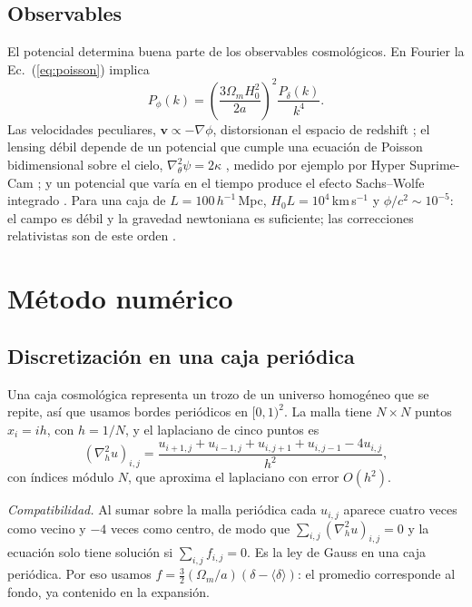 \documentclass{aa}
\newcommand{\vv}{\mathbf{v}}
\begin{document}
\subsection{Observables}

El potencial determina buena parte de los observables cosmológicos. En Fourier la Ec.~(\ref{eq:poisson}) implica
\begin{equation}
  P_\phi(k) = \left(\frac{3\Omega_mH_0^2}{2a}\right)^2\frac{P_\delta(k)}{k^4}.
  \label{eq:espectro}
\end{equation}
Las velocidades peculiares, $\vv\propto-\nabla\phi$, distorsionan el espacio de redshift \citep{Kaiser1987}; el lensing débil depende de un potencial que cumple una ecuación de Poisson bidimensional sobre el cielo, $\nabla_\theta^2\psi=2\kappa$ \citep{Kaiser1993,Bartelmann2001}, medido por ejemplo por Hyper Suprime-Cam \citep{Aihara2022,Li2022}; y un potencial que varía en el tiempo produce el efecto Sachs--Wolfe integrado \citep{Sachs1967}. Para una caja de $L=100\,h^{-1}$\,Mpc, $H_0L=10^4$\,km\,s$^{-1}$ y $\phi/c^2\sim10^{-5}$: el campo es débil y la gravedad newtoniana es suficiente; las correcciones relativistas son de este orden \citep{BarreraHinojosa2020a,Beordo2025}.

\section{Método numérico}

\subsection{Discretización en una caja periódica}

Una caja cosmológica representa un trozo de un universo homogéneo que se repite, así que usamos bordes periódicos en $[0,1)^2$. La malla tiene $N\times N$ puntos $x_i=ih$, con $h=1/N$, y el laplaciano de cinco puntos es
\begin{equation}
  (\nabla_h^2u)_{i,j} = \frac{u_{i+1,j}+u_{i-1,j}+u_{i,j+1}+u_{i,j-1}-4u_{i,j}}{h^2},
\end{equation}
con índices módulo $N$, que aproxima el laplaciano con error $O(h^2)$.

\emph{Compatibilidad.} Al sumar sobre la malla periódica cada $u_{i,j}$ aparece cuatro veces como vecino y $-4$ veces como centro, de modo que $\sum_{i,j}(\nabla_h^2u)_{i,j}=0$ y la ecuación solo tiene solución si $\sum_{i,j}f_{i,j}=0$. Es la ley de Gauss en una caja periódica. Por eso usamos $f=\tfrac32(\Omega_m/a)(\delta-\langle\delta\rangle)$: el promedio corresponde al fondo, ya contenido en la expansión.
\end{document}
